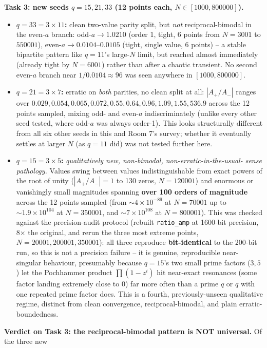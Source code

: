 \textbf{Task 3: new seeds $q=15,21,33$ (12 points each, $N\in[1000,800000]$).}
\begin{itemize}
\item \textbf{$q=33=3\times11$:} clean two-value parity split, but \emph{not} reciprocal-bimodal
  in the even-$a$ branch: odd-$a\to1.0210$ (order 1, tight, 6 points from $N=3001$ to $550001$),
  even-$a\to0.0104$--$0.0105$ (tight, single value, 6 points) -- a stable bipartite pattern like
  $q=11$'s large-$N$ limit, but reached almost immediately (already tight by $N=6001$) rather than
  after a chaotic transient. No second even-$a$ branch near $1/0.0104\approx96$ was seen anywhere
  in $[1000,800000]$.
\item \textbf{$q=21=3\times7$:} erratic on \emph{both} parities, no clean split at all:
  $|A_+/A_-|$ ranges over $0.029,0.054,0.065,0.072,0.55,0.64,0.96,1.09,1.55,536.9$ across the 12
  points sampled, mixing odd- and even-$a$ indiscriminately (unlike every other seed tested, where
  odd-$a$ was always order-1). This looks structurally different from all six other seeds in this
  and Room 7's survey; whether it eventually settles at larger $N$ (as $q=11$ did) was not tested
  further here.
\item \textbf{$q=15=3\times5$:} \emph{qualitatively new, non-bimodal, non-erratic-in-the-usual-
  sense pathology.} Values swing between values indistinguishable from exact powers of the root
  of unity ($|A_+/A_-|=1$ to 130 zeros, $N=120001$) and enormous or vanishingly small magnitudes
  spanning \textbf{over 100 orders of magnitude} across the 12 points sampled (from
  $\sim\!4\times10^{-89}$ at $N=70001$ up to $\sim\!1.9\times10^{104}$ at $N=350001$, and
  $\sim\!7\times10^{108}$ at $N=800001$). This was checked against the precision-audit protocol
  (rebuilt \texttt{ratio\_amp} at 1600-bit precision, 8$\times$ the original, and rerun the three
  most extreme points, $N=20001,200001,350001$): all three reproduce \textbf{bit-identical} to
  the 200-bit run, so this is not a precision failure -- it is genuine, reproducible near-singular
  behaviour, presumably because $q=15$'s two small prime factors ($3,5$) let the Pochhammer
  product $\prod(1-z^i)$ hit near-exact resonances (some factor landing extremely close to $0$)
  far more often than a prime $q$ or $q$ with one repeated prime factor does. This is a fourth,
  previously-unseen qualitative regime, distinct from clean convergence, reciprocal-bimodal, and
  plain erratic-boundedness.
\end{itemize}
\textbf{Verdict on Task 3: the reciprocal-bimodal pattern is NOT universal.} Of the three new
